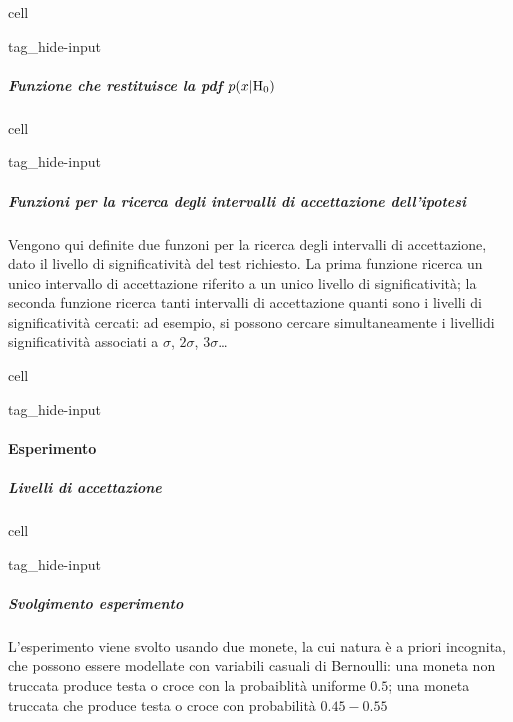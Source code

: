 \documentclass[letterpaper,10pt,italian]{jupyterBook}
\begin{document}
\begin{sphinxuseclass}{cell}
\begin{sphinxuseclass}{tag_hide-input}
\end{sphinxuseclass}
\end{sphinxuseclass}

\subparagraph{Funzione che restituisce la pdf \protect\(p(x|\text{H}_0)\protect\)}
\label{\detokenize{ch/statistics/test-fisher-coin-2:funzione-che-restituisce-la-pdf-p-x-text-h-0}}
\begin{sphinxuseclass}{cell}
\begin{sphinxuseclass}{tag_hide-input}
\end{sphinxuseclass}
\end{sphinxuseclass}

\subparagraph{Funzioni per la ricerca degli intervalli di accettazione dell’ipotesi}
\label{\detokenize{ch/statistics/test-fisher-coin-2:funzioni-per-la-ricerca-degli-intervalli-di-accettazione-dell-ipotesi}}
\sphinxAtStartPar
Vengono qui definite due funzoni per la ricerca degli intervalli di accettazione, dato il livello di significatività del test richiesto. La prima funzione ricerca un unico intervallo di accettazione riferito a un unico livello di significatività; la seconda funzione ricerca tanti intervalli di accettazione quanti sono i livelli di significatività cercati: ad esempio, si possono cercare simultaneamente i livellidi significatività associati a \(\sigma\), \(2 \sigma\), \(3 \sigma\)…

\begin{sphinxuseclass}{cell}
\begin{sphinxuseclass}{tag_hide-input}
\end{sphinxuseclass}
\end{sphinxuseclass}

\paragraph{Esperimento}
\label{\detokenize{ch/statistics/test-fisher-coin-2:esperimento}}

\subparagraph{Livelli di accettazione}
\label{\detokenize{ch/statistics/test-fisher-coin-2:livelli-di-accettazione}}
\begin{sphinxuseclass}{cell}
\begin{sphinxuseclass}{tag_hide-input}
\end{sphinxuseclass}
\end{sphinxuseclass}

\subparagraph{Svolgimento esperimento}
\label{\detokenize{ch/statistics/test-fisher-coin-2:svolgimento-esperimento}}
\sphinxAtStartPar
L’esperimento viene svolto usando due monete, la cui natura è a priori incognita, che possono essere modellate con variabili casuali di Bernoulli: una moneta non truccata produce testa o croce con la probaiblità uniforme \(0.5\); una moneta truccata che produce testa o croce con probabilità \(0.45 - 0.55\)
\end{document}
